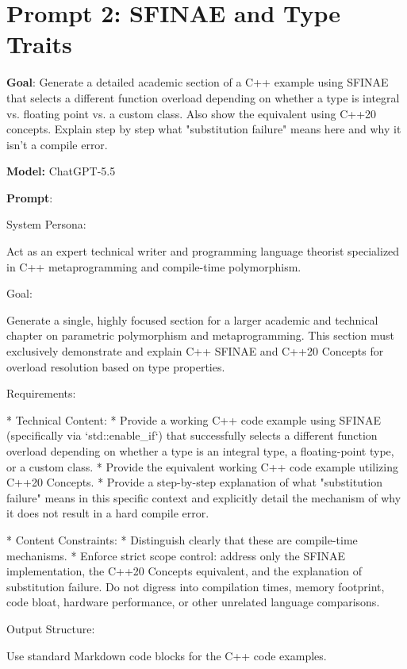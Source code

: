 \documentclass[11pt]{report}
\begin{document}
\section{Prompt 2: SFINAE and Type Traits}

\noindent\textbf{Goal}: Generate a detailed academic section of a C++ example using SFINAE that selects a different function overload depending on whether a type is integral vs. floating point vs. a custom class. Also show the equivalent using C++20 concepts. Explain step by step what "substitution failure" means here and why it isn't a compile error.

\noindent\textbf{Model:} ChatGPT-5.5

\noindent\textbf{Prompt}:
\begin{PromptVerbatim}
System Persona:

Act as an expert technical writer and programming language theorist specialized in C++ metaprogramming and compile-time polymorphism.

Goal:

Generate a single, highly focused section for a larger academic and technical chapter on parametric polymorphism and metaprogramming. This section must exclusively demonstrate and explain C++ SFINAE and C++20 Concepts for overload resolution based on type properties.

Requirements:

* Technical Content:
* Provide a working C++ code example using SFINAE (specifically via `std::enable_if`) that successfully selects a different function overload depending on whether a type is an integral type, a floating-point type, or a custom class.
* Provide the equivalent working C++ code example utilizing C++20 Concepts.
* Provide a step-by-step explanation of what "substitution failure" means in this specific context and explicitly detail the mechanism of why it does not result in a hard compile error.

* Content Constraints:
* Distinguish clearly that these are compile-time mechanisms.
* Enforce strict scope control: address only the SFINAE implementation, the C++20 Concepts equivalent, and the explanation of substitution failure. Do not digress into compilation times, memory footprint, code bloat, hardware performance, or other unrelated language comparisons.

Output Structure:

Use standard Markdown code blocks for the C++ code examples.
\end{PromptVerbatim}
\end{document}
